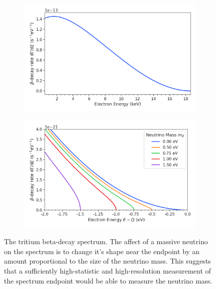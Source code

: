 \begin{figure}[htbp]
    \centering
    \begin{subfigure}{0.6\textwidth}
        \includegraphics[width=\textwidth]{figs/Chapter-2/230302_atomic_tritium_spectrum.png}
        \caption{}
    \end{subfigure}
    \begin{subfigure}{0.6\textwidth}
        \includegraphics*[width=\textwidth]{figs/Chapter-2/230302_atomic_tritium_spectrum_near_endpoint.png}
        \caption{}
    \end{subfigure}
    \caption{The tritium beta-decay spectrum. The affect of a massive neutrino on the spectrum is to change it's shape near the endpoint by an amount proportional to the size of the neutrino mass. This suggests that a sufficiently high-statistic and high-resolution measurement of the spectrum endpoint would be able to measure the neutrino mass.}
    \label{fig:chap2-atomic-tritium-endpoint}
\end{figure}

